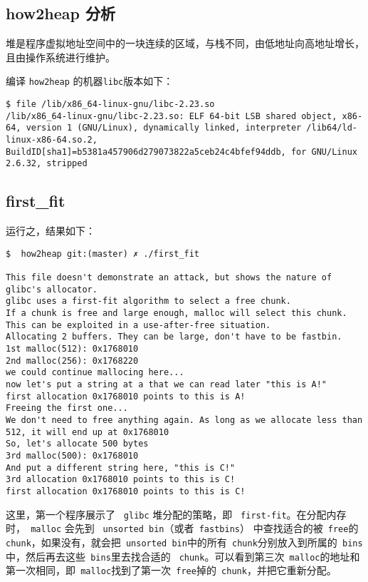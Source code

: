 \begin{center}
    \section{how2heap 分析}
\end{center}

\setlength{\parindent}{2em}
堆是程序虚拟地址空间中的一块连续的区域，与栈不同，由低地址向高地址增长，且由操作系统进行维护。

编译 \verb+how2heap+ 的机器\verb+libc+版本如下：
\begin{verbatim}
$ file /lib/x86_64-linux-gnu/libc-2.23.so
/lib/x86_64-linux-gnu/libc-2.23.so: ELF 64-bit LSB shared object, x86-64, version 1 (GNU/Linux), dynamically linked, interpreter /lib64/ld-linux-x86-64.so.2, BuildID[sha1]=b5381a457906d279073822a5ceb24c4bfef94ddb, for GNU/Linux 2.6.32, stripped
\end{verbatim}

\subsection{first\_fit}
\setlength{\parindent}{2em}

运行之，结果如下：

\begin{verbatim}
$  how2heap git:(master) ✗ ./first_fit

This file doesn't demonstrate an attack, but shows the nature of glibc's allocator.
glibc uses a first-fit algorithm to select a free chunk.
If a chunk is free and large enough, malloc will select this chunk.
This can be exploited in a use-after-free situation.
Allocating 2 buffers. They can be large, don't have to be fastbin.
1st malloc(512): 0x1768010
2nd malloc(256): 0x1768220
we could continue mallocing here...
now let's put a string at a that we can read later "this is A!"
first allocation 0x1768010 points to this is A!
Freeing the first one...
We don't need to free anything again. As long as we allocate less than 512, it will end up at 0x1768010
So, let's allocate 500 bytes
3rd malloc(500): 0x1768010
And put a different string here, "this is C!"
3rd allocation 0x1768010 points to this is C!
first allocation 0x1768010 points to this is C!
\end{verbatim}

这里，第一个程序展示了 \verb+ glibc+ 堆分配的策略，即 \verb+ first-fit+。在分配内存时，\verb+ malloc+ 会先到 \verb+ unsorted bin+（或者\verb+ fastbins+） 中查找适合的被\verb+ free+的\verb+ chunk+，如果没有，就会把\verb+ unsorted bin+中的所有\verb+ chunk+分别放入到所属的\verb+ bins+中，然后再去这些\verb+ bins+里去找合适的 \verb+ chunk+。可以看到第三次\verb+ malloc+的地址和第一次相同，即\verb+ malloc+找到了第一次\verb+ free+掉的\verb+ chunk+，并把它重新分配。


